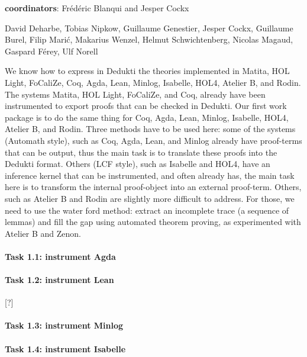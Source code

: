 {\bf coordinators}: Frédéric Blanqui and Jesper Cockx

David Deharbe, Tobias Nipkow, Guillaume Genestier, Jesper
Cockx, Guillaume Burel, Filip Marić, Makarius Wenzel, Helmut
Schwichtenberg, Nicolas Magaud, Gaspard Férey, Ulf Norell





We know how to express in Dedukti the theories implemented in Matita,
HOL Light, FoCaliZe, Coq, Agda, Lean, Minlog, Isabelle, HOL4,
Atelier B, and Rodin. The systems Matita, HOL Light, FoCaliZe, and
Coq, already have been instrumented to export proofs that can be
checked in Dedukti. Our first work package is to do the same thing for
Coq, Agda, Lean, Minlog, Isabelle, HOL4, Atelier B, and
Rodin. Three methods have to be used here: some of the systems
(Automath style), such as Coq, Agda, Lean, and Minlog already have
proof-terms that can be output, thus the main task is to translate
these proofs into the Dedukti format. Others (LCF style), such as
Isabelle and HOL4, have an inference kernel that can be
instrumented, and often already has, the main task here is to transform
the internal proof-object into an external proof-term. Others, such as
Atelier B and Rodin are slightly more difficult to address. For those,
we need to use the water ford method: extract an incomplete trace (a
sequence of lemmas) and fill the gap using automated theorem proving,
as experimented with Atelier B and Zenon.


\paragraph{Task 1.1: instrument Agda}



\paragraph{Task 1.2: instrument Lean}

[?]

\paragraph{Task 1.3: instrument Minlog}



\paragraph{Task 1.4: instrument Isabelle}

